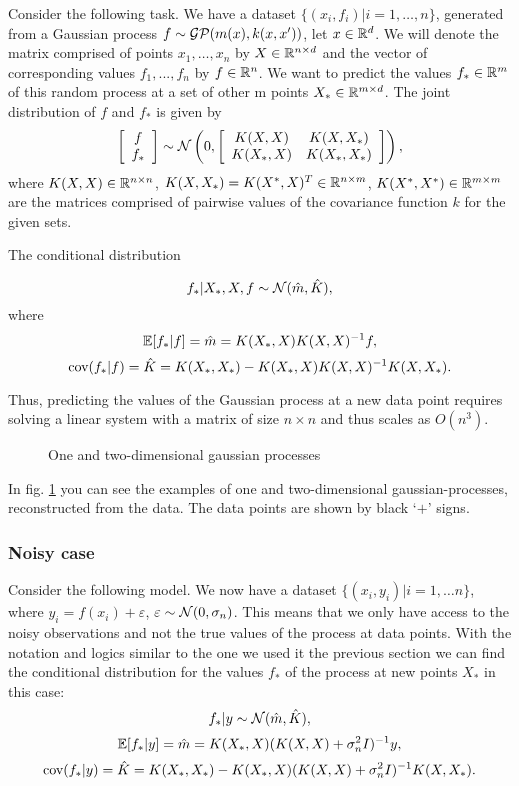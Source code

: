 Consider the following task. We have a dataset $\{(x_i, f_i) | i = 1, \ldots, n\}$, generated from a Gaussian process $f \sim \mathcal{GP}(m(x), k(x, x'))$, let $x \in \mathbb{R}^d$.  We will denote the matrix comprised of points $x_1, \ldots, x_n$ by $X \in \mathbb{R}^{n \times d}$ and the vector of corresponding values $f_1, ..., f_n$ by $f \in \mathbb{R}^n$. We want to predict the values $f_* \in \mathbb{R}^m$ of this random process at a set of other m points $X_* \in \mathbb{R}^{m \times d}$. The joint distribution of $f$ and $f_*$ is given by
$$
\left [ \begin{array}{c} f\\ f_* \end{array} \right ]
\sim
\mathcal{N} \left ( 0, \left [\begin{array}{cc} K(X, X) & K(X, X_*)\\ K(X_*, X) & K(X_*, X_*) \end{array} \right] \right ),
$$
where $K(X, X) \in \mathbb{R}^{n \times n}$, $K(X, X_*) = K(X^*, X)^T \in \mathbb{R}^{n \times m}$, $K(X^*, X^*) \in \mathbb{R}^{m \times m}$ are the matrices comprised of pairwise values of the covariance function $k$ for the given sets.

The conditional distribution

$$f_* | X_*, X, f \sim \mathcal{N}( \hat m, \hat K ),$$
where 
$$\mathbb{E} [f_* | f ] = \hat m = K(X_*, X) K(X, X)^{-1} f,$$
$$\mbox{cov}(f_* | f ) = \hat K = K(X_*, X_*) - K(X_*, X)K(X, X)^{-1}K(X, X_*).$$
	
Thus, predicting the values of the Gaussian process at a new data point requires solving a linear system with a matrix of size $n \times n$ and thus scales as $O(n^3)$.

\begin{figure}[!h]
	\centering
	\subfloat{
		\scalebox{0.7}{
			
		}
	}
	\subfloat{
		\scalebox{0.7}{
    		
		}
	}
	\caption{One and two-dimensional gaussian processes}
	\label{brute_reg_example}
\end{figure}


In fig. \ref{brute_reg_example} you can see the examples of one and two-dimensional gaussian-processes, reconstructed from the data. The data points are shown by black `$+$' signs.

\subsubsection{Noisy case}
	Consider the following model. We now have a dataset $\{(x_i, y_i)| i = 1, \ldots n\}$, where $y_i = f(x_i) + \varepsilon$, $\varepsilon \sim \mathcal{N}(0, \sigma_n)$. This means that we only have access to the noisy observations and not the true values of the process at data points. With the notation and logics similar to the one we used it the previous section we can find the conditional distribution for the values $f_*$ of the process at new points $X_*$ in this case:
	$$f_* | y \sim \mathcal{N}( \hat m, \hat K ),$$
	$$\mathbb{E}[f_* | y] = \hat m = K(X_*, X) (K(X, X) + \sigma_n^2 I)^{-1} y,$$
	$$\mbox{cov}(f_* | y ) = \hat K = K(X_*, X_*) - K(X_*, X)(K(X, X) + \sigma_n^2 I)^{-1}K(X, X_*).$$